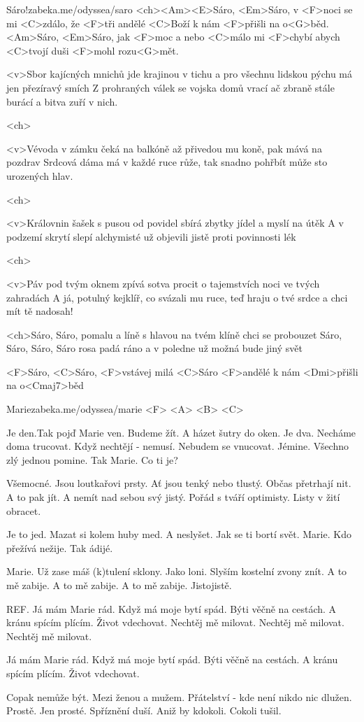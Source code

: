 


\songtitlepage

\begin{song}[Traband]{1}{Sáro!}{zabeka.me/odyssea/saro}
<ch><Am><E>Sáro, <Em>Sáro, v <F>noci se mi <C>zdálo,
že <F>tři andělé <C>Boží k nám <F>přišli na o<G>běd.
<Am>Sáro, <Em>Sáro, jak <F>moc a nebo <C>málo
mi <F>chybí abych <C>tvojí duši <F>mohl rozu<G>mět.

<v>Sbor kajícných mnichů jde krajinou v tichu 
a pro všechnu lidskou pýchu má jen přezíravý smích 
Z prohraných válek se vojska domů vrací 
ač zbraně stále burácí a bitva zuří v nich.

<ch>

<v>Vévoda v zámku čeká na balkóně 
až přivedou mu koně, pak mává na pozdrav 
Srdcová dáma má v každé ruce růže, 
tak snadno pohřbít může sto urozených hlav.

<ch>

<v>Královnin šašek s pusou od povidel 
sbírá zbytky jídel a myslí na útěk 
A v podzemí skrytí slepí alchymisté 
už objevili jistě proti povinnosti lék

<ch>

<v>Páv pod tvým oknem zpívá sotva procit 
o tajemstvích noci ve tvých zahradách 
A já, potulný kejklíř, co svázali mu ruce, 
teď hraju o tvé srdce a chci mít tě nadosah!

<ch>Sáro, Sáro, pomalu a líně 
s hlavou na tvém klíně chci se probouzet 
Sáro, Sáro, Sáro, Sáro rosa padá ráno 
a v poledne už možná bude jiný svět

<F>Sáro, <C>Sáro, <F>vstávej milá <C>Sáro 
<F>andělé k nám <Dmi>přišli na o<Cmaj7>běd


\end{song}
\begin{song}{2}{Marie}{zabeka.me/odyssea/marie}
<F> <A> <B> <C>

Je den.Tak pojď Marie ven.
Budeme žít. A házet šutry do oken.
Je dva. Necháme doma trucovat.
Když nechtějí - nemusí. Nebudem se vnucovat. 
Jémine. Všechno zlý jednou pomine.
Tak Marie. Co ti je?

Všemocné. Jsou loutkařovi prsty.
Ať jsou tenký nebo tlustý. Občas přetrhají nit.
A to pak jít. A nemít nad sebou svý jistý.
Pořád s tváří optimisty. Listy v žití obracet.

Je to jed. Mazat si kolem huby med.
A neslyšet. Jak se ti bortí svět.
Marie. Kdo přežívá nežije. Tak ádijé.

Marie. Už zase máš (k)tulení sklony.
Jako loni. Slyším kostelní zvony znít.
A to mě zabije. A to mě zabije.
A to mě zabije. Jistojistě.

REF.
Já mám Marie rád. Když má moje bytí spád.
Býti věčně na cestách. A kránu spícím plícím.
Život vdechovat. Nechtěj mě milovat.
Nechtěj mě milovat. Nechtěj mě milovat.

Já mám Marie rád. Když má moje bytí spád.
Býti věčně na cestách. A kránu spícím plícím.
Život vdechovat.

Copak nemůže být. Mezi ženou a mužem.
Přátelství - kde není nikdo nic dlužen. Prostě.
Jen prosté. Spříznění duší.
Aniž by kdokoli. Cokoli tušil.

\end{song}
